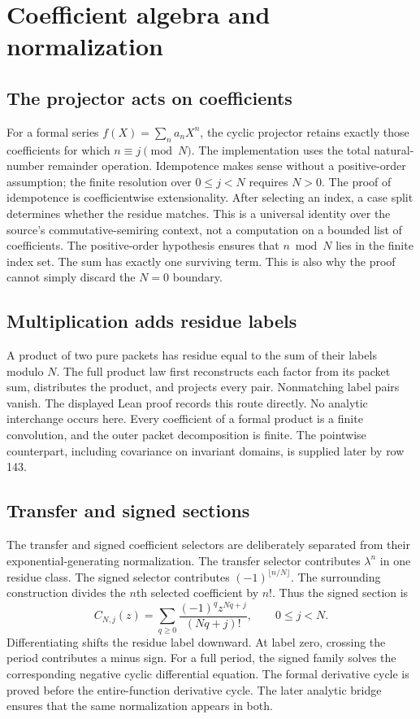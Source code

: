 \section{Coefficient algebra and normalization}
\subsection{The projector acts on coefficients}
For a formal series $f(X)=\sum_n a_nX^n$, the cyclic projector retains exactly those coefficients for which $n\equiv j\pmod N$. The implementation uses the total natural-number remainder operation. Idempotence makes sense without a positive-order assumption; the finite resolution over $0\leq j<N$ requires $N>0$.
The proof of idempotence is coefficientwise extensionality. After selecting an index, a case split determines whether the residue matches. This is a universal identity over the source's commutative-semiring context, not a computation on a bounded list of coefficients.
The positive-order hypothesis ensures that $n\bmod N$ lies in the finite index set. The sum has exactly one surviving term. This is also why the proof cannot simply discard the $N=0$ boundary.

\subsection{Multiplication adds residue labels}
A product of two pure packets has residue equal to the sum of their labels modulo $N$. The full product law first reconstructs each factor from its packet sum, distributes the product, and projects every pair. Nonmatching label pairs vanish. The displayed Lean proof records this route directly.
No analytic interchange occurs here. Every coefficient of a formal product is a finite convolution, and the outer packet decomposition is finite. The pointwise counterpart, including covariance on invariant domains, is supplied later by row 143.

\subsection{Transfer and signed sections}
The transfer and signed coefficient selectors are deliberately separated from their exponential-generating normalization.
The transfer selector contributes $\lambda^n$ in one residue class. The signed selector contributes $(-1)^{\lfloor n/N\rfloor}$. The surrounding  construction divides the $n$th selected coefficient by $n!$. Thus the signed section is
\[
 C_{N,j}(z)=\sum_{q\geq0}\frac{(-1)^qz^{Nq+j}}{(Nq+j)!},\qquad 0\leq j<N.
\]
Differentiating shifts the residue label downward. At label zero, crossing the period contributes a minus sign.
For a full period, the signed family solves the corresponding negative cyclic differential equation. The formal derivative cycle is proved before the entire-function derivative cycle. The later analytic bridge ensures that the same normalization appears in both.

